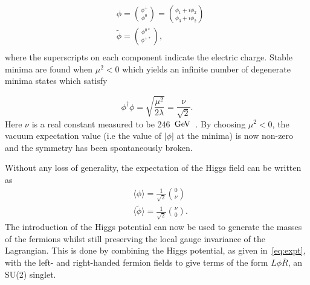 \begin{equation}
  \begin{split}
    &
    \phi = \binom{\phi^{+}}{\phi^{0}}  = \binom{\phi_{1} + i\phi_{2}}{\phi_{3} + i\phi_{2}}\\
    &
    \tilde{\phi} = \binom{\phi^{0*}}{\phi^{+*}},\\
    \end{split}
  \label{eq:higgsspin_1}
\end{equation}
where the superscripts on each component indicate the electric charge. %
Stable minima are found when $\mu^{2}<0$ which yields an infinite number of degenerate minima states which satisfy

\begin{equation}
 \phi^\dagger\phi =  \sqrt{\frac{\mu^{2}}{2\lambda}} = \frac{\nu}{\sqrt{2}}.
\end{equation}
Here $\nu$ is a real constant measured to be 246 $\mathrm{\,Ge\kern -0.1em V}$~\cite{pdg}. By choosing $\mu^{2}<0$, the vacuum expectation value (i.e the value of $|\phi|$ at the minima) is now non-zero and the symmetry has been spontaneously broken. %

 Without any loss of generality, the expectation of the Higgs field can be written as
 \begin{equation}
   \label{eq:expt}
   \begin{split}
     & \langle{\phi}\rangle = \frac{1}{\sqrt{2}}\binom{0}{\nu} \\ %
     &\langle\tilde{\phi}\rangle = \frac{1}{\sqrt{2}}\binom{\nu}{0}.
   \end{split}
\end{equation}
The introduction of the Higgs potential can now be used to generate the masses of the fermions whilst still preserving the local gauge invariance of the Lagrangian. This is done by combining the Higgs potential, as given in~\autoref{eq:expt}, with the left- and right-handed fermion fields to give terms of the form $L\phi\overline{R}$,  an SU(2) singlet.%

